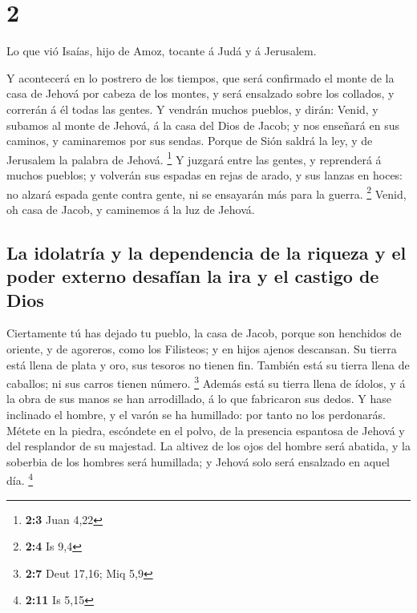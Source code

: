 \hypertarget{section-1}{%
\section{2}\label{section-1}}

 Lo que vió Isaías, hijo de Amoz, tocante á Judá y á
Jerusalem.

 Y acontecerá en lo postrero de los tiempos, que será
confirmado el monte de la casa de Jehová por cabeza de los montes, y
será ensalzado sobre los collados, y correrán á él todas las gentes.
 Y vendrán muchos pueblos, y dirán: Venid, y subamos al
monte de Jehová, á la casa del Dios de Jacob; y nos enseñará en sus
caminos, y caminaremos por sus sendas. Porque de Sión saldrá la ley, y
de Jerusalem la palabra de Jehová. \footnote{\textbf{2:3} Juan 4,22}
 Y juzgará entre las gentes, y reprenderá á muchos
pueblos; y volverán sus espadas en rejas de arado, y sus lanzas en
hoces: no alzará espada gente contra gente, ni se ensayarán más para la
guerra. \footnote{\textbf{2:4} Is 9,4}  Venid, oh casa de
Jacob, y caminemos á la luz de Jehová.

\hypertarget{la-idolatruxeda-y-la-dependencia-de-la-riqueza-y-el-poder-externo-desafuxedan-la-ira-y-el-castigo-de-dios}{%
\subsection{La idolatría y la dependencia de la riqueza y el poder
externo desafían la ira y el castigo de
Dios}\label{la-idolatruxeda-y-la-dependencia-de-la-riqueza-y-el-poder-externo-desafuxedan-la-ira-y-el-castigo-de-dios}}

 Ciertamente tú has dejado tu pueblo, la casa de Jacob,
porque son henchidos de oriente, y de agoreros, como los Filisteos; y en
hijos ajenos descansan.  Su tierra está llena de plata y
oro, sus tesoros no tienen fin. También está su tierra llena de
caballos; ni sus carros tienen número. \footnote{\textbf{2:7} Deut
  17,16; Miq 5,9}  Además está su tierra llena de ídolos,
y á la obra de sus manos se han arrodillado, á lo que fabricaron sus
dedos.  Y hase inclinado el hombre, y el varón se ha
humillado: por tanto no los perdonarás.  Métete en la
piedra, escóndete en el polvo, de la presencia espantosa de Jehová y del
resplandor de su majestad.  La altivez de los ojos del
hombre será abatida, y la soberbia de los hombres será humillada; y
Jehová solo será ensalzado en aquel día. \footnote{\textbf{2:11} Is 5,15}

